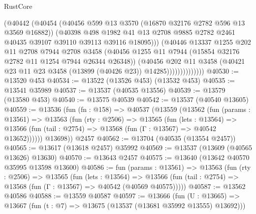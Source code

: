 \begin{lexlean}{RustCore}
\begin{coremodule}
                          (@40442
                            (@40454
                              (@40456 @599 @13 @3570 (@16870 @32176 @2782 @596 @13 @3569 @16882))
                              (@40398
                                @498
                                @1982
                                @41
                                @13
                                @2708
                                @9885
                                @2782
                                @2461
                                @40435
                                @39107
                                @39110
                                @39113
                                @39116
                                @18095)))
                          (@40446
                            @13337
                            @1255
                            @202
                            @11
                            @2708
                            @7944
                            @2708
                            @3458
                            (@40456
                              @1255
                              @11
                              @7944
                              (@15854 @32176 @2782 @11 @1254 @7944 @26344 @26348))
                            (@40456
                              @202
                              @11
                              @3458
                              (@40421 @23 @11 @23 @3458 (@13899 (@40426 @23)) @14285))))))))))))))
@40530 := @13520 @453
@40534 := @13522 (@13526 @453) (@13532 @453)
@40535 := @13541 @35989
@40537 := @13537 (@40535 @13556)
@40539 := @13579 (@13580 @453)
@40540 := @13575 @40539
@40542 := @13537 (@40540 @13605)
@40559 := @13536
    (fun (fn : @158) =>
    @40537
      (@13559
        (@13562
          (fun (params : @13561) =>
          @13563
            (fun (rty : @2506) =>
            @13565
              (fun (lets : @13564) =>
              @13566 (fun (tail : @2754) => @13568 (fun (Γ : @13567) => @40542 @13652))))))
        @13698))
    @2457
@40562 := @13704 (@40535 (@13554 @2457))
@40565 := @13617 (@13618 @2457) @35992
@40569 := @13537 (@13609 (@40565 @13626) @13630)
@40570 := @13643 @2457
@40575 := @13640 (@13642 @40570 @35995 @13598 @13600)
@40586 := fun (params : @13561) =>
  @13563
    (fun (rty : @2506) =>
    @13565
      (fun (lets : @13564) =>
      @13566 (fun (tail : @2754) => @13568 (fun (Γ : @13567) => @40542 (@40569 @40575)))))
@40587 := @13562 @40586
@40588 := @13559 @40587
@40597 := @13666
    (fun (U : @13665) => @13667 (fun (t : @7) => @13675 (@13537 (@13681 @35992 @13555) @13692)))

\end{coremodule}
\end{lexlean}
